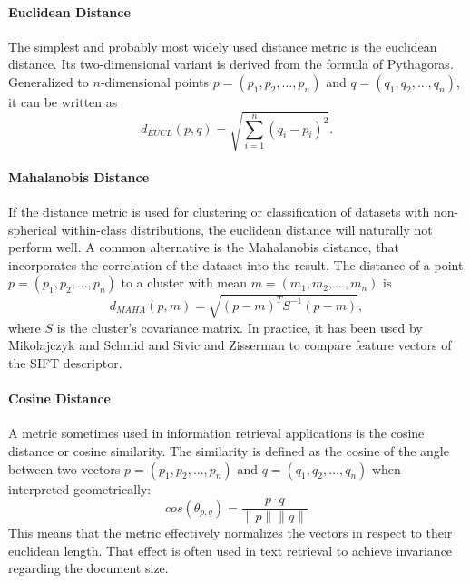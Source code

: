 \paragraph{Euclidean Distance}\label{sec:anatomy_ranking_distance_euclidean}

The simplest and probably most widely used distance metric is the euclidean
distance. Its two-dimensional variant is derived from the formula of
Pythagoras. Generalized to $n$-dimensional points $p = (p_1, p_2, \dots, p_n)$
and $q = (q_1, q_2, \dots, q_n)$, it can be written as
\begin{equation*}
    d_{EUCL}(p, q) = \sqrt{\sum_{i=1}^n (q_i - p_i)^2}.
\end{equation*}

\paragraph{Mahalanobis Distance}

If the distance metric is used for clustering or classification of datasets
with non-spherical within-class distributions, the euclidean distance will
naturally not perform well. A common alternative is the Mahalanobis distance,
that incorporates the correlation of the dataset into the result. The distance
of a point $p = (p_1, p_2, \dots, p_n)$ to a cluster with mean $m = (m_1, m_2,
\dots, m_n)$ is
\begin{equation*}
    d_{MAHA}(p, m) = \sqrt{(p - m)^T S^{-1} (p - m)},
\end{equation*}
where $S$ is the cluster's covariance matrix. In practice, it has been used by
Mikolajczyk and Schmid \autocite{mikolajczyk_scale_2004} and
Sivic and Zisserman \autocite{sivic_video_2003} to compare feature vectors of
the SIFT \autocite{lowe_object_1999} descriptor.

\paragraph{Cosine Distance}

A metric sometimes used in information retrieval applications is the cosine
distance or cosine similarity. The similarity is defined as the cosine of the
angle between two vectors $p = (p_1, p_2, \dots, p_n)$ and $q = (q_1, q_2,
\dots, q_n)$ when interpreted geometrically:
\begin{equation*}
    cos(\theta_{p, q}) = \frac{p \cdot q}{\|p\| \|q\|}
\end{equation*}
This means that the metric effectively normalizes the vectors in respect to
their euclidean length. That effect is often used in text retrieval to achieve
invariance regarding the document size.

